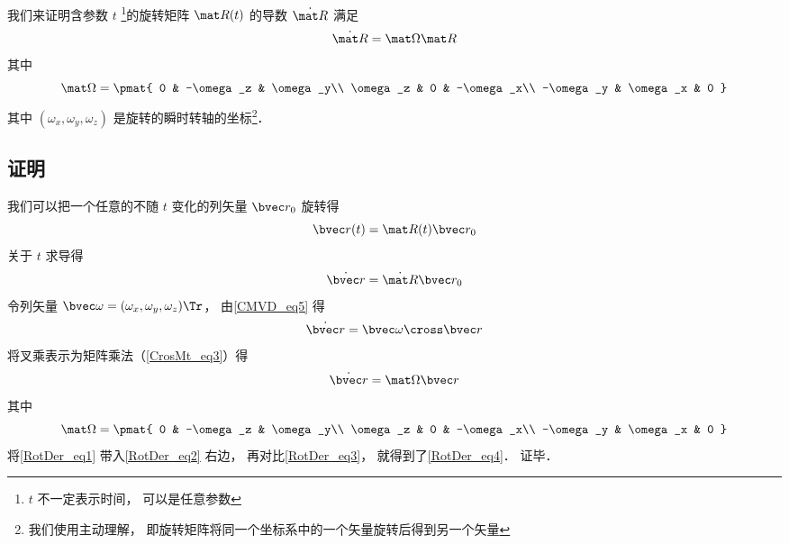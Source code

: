 

我们来证明含参数 $t$ \footnote{$t$ 不一定表示时间， 可以是任意参数}的旋转矩阵 $\mat R(t)$ 的导数 $\dot{\mat R}$ 满足
\begin{equation}\label{RotDer_eq4}
\dot{\mat R} = \mat \Omega \mat R
\end{equation}
其中
\begin{equation}
\mat \Omega = \pmat{
0 & -\omega_z & \omega_y\\
\omega_z & 0 & -\omega_x\\
-\omega_y & \omega_x & 0
}
\end{equation}
其中 $(\omega_x, \omega_y, \omega_z)$ 是旋转的瞬时转轴的坐标\footnote{我们使用主动理解， 即旋转矩阵将同一个坐标系中的一个矢量旋转后得到另一个矢量}．

\subsection{证明}
我们可以把一个任意的不随 $t$ 变化的列矢量 $\bvec r_0$ 旋转得
\begin{equation}\label{RotDer_eq1}
\bvec r(t) = \mat R(t) \bvec r_0
\end{equation}
关于 $t$ 求导得
\begin{equation}\label{RotDer_eq3}
\dot{\bvec r} = \dot{\mat R} \bvec r_0
\end{equation}
令列矢量 $\bvec \omega = (\omega_x, \omega_y, \omega_z)\Tr$， 由\autoref{CMVD_eq5} 得
\begin{equation}
\dot{\bvec r} = \bvec\omega \cross \bvec r
\end{equation}
将叉乘表示为矩阵乘法（\autoref{CrosMt_eq3}）得
\begin{equation}\label{RotDer_eq2}
\dot{\bvec r} = \mat\Omega \bvec r
\end{equation}
其中
\begin{equation}
\mat \Omega = \pmat{
0 & -\omega_z & \omega_y\\
\omega_z & 0 & -\omega_x\\
-\omega_y & \omega_x & 0
}\end{equation}
将\autoref{RotDer_eq1} 带入\autoref{RotDer_eq2} 右边， 再对比\autoref{RotDer_eq3}， 就得到了\autoref{RotDer_eq4}． 证毕．
